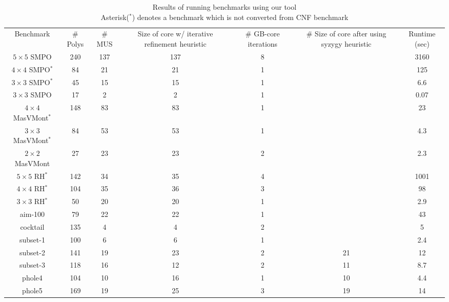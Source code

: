 \vspace{-0.1in}
\begin{table}[htb]
\centering
\caption{\centering Results of running benchmarks using our tool\\
\small{Asterisk($^*$) denotes a benchmark which is not converted from CNF benchmark}}
\begin{tabular}{|c||c|c|c|c|c|c|}
\hline
\multirow{4}{2.2cm}{\centering Benchmark} 
& \multirow{4}{0.9cm}{\centering \# Polys} 
& \multirow{4}{0.8cm}{\centering \# MUS} 
& \multirow{4}{1.9cm}{\centering Size of core w/ iterative refinement heuristic}
 & \multirow{4}{1.6cm}{\centering \# GB-core iterations}
 & \multirow{4}{2cm}{\centering \# Size of core after using syzygy heuristic}
 & \multirow{4}{1.3cm}{\centering Runtime (sec)} \\
  & & & & & & \\
    & & & & & & \\
      & & & & & & \\
\hline
\hline
$5\times 5$ SMPO & 240  & 137  & 137  & 8  &  & 3160\\
$4\times 4$ SMPO$^*$ & 84  & 21  & 21  & 1  &  & 125\\
$3\times 3$ SMPO$^*$ & 45  & 15  & 15  & 1  &  & 6.6\\
$3 \times 3$ SMPO & 17 & 2 & 2 & 1 &  & 0.07  \\
$4 \times 4$ MasVMont$^*$ & 148 & 83 & 83 & 1 &  & 23 \\
$3 \times 3$ MasVMont$^*$ & 84 & 53 & 53 & 1 &  & 4.3 \\
$2 \times 2$ MasVMont & 27 & 23 & 23 & 2 &  & 2.3 \\
$5\times 5$ RH$^*$ & 142  & 34  & 35  & 4  &  & 1001\\
$4\times 4$ RH$^*$ & 104  & 35  & 36  & 3  &  & 98\\
$3\times 3$ RH$^*$ & 50  & 20  & 20  & 1  &  & 2.9\\
aim-100 & 79 & 22 & 22 & 1  &  & 43\\
cocktail & 135 & 4 & 4 & 2 &  & 5 \\
subset-1 & 100 & 6 & 6 & 1 &  & 2.4 \\
subset-2 & 141 & 19 & 23 & 2 & 21 & 12 \\
subset-3 & 118 & 16 & 12 & 2 & 11 & 8.7 \\
phole4 & 104 & 10 & 16 & 1 & 10 & 4.4 \\
phole5 & 169 & 19 & 25 & 3 & 19 & 14 \\
\hline
\end{tabular}
\label{tab:result}  
\end{table} 


